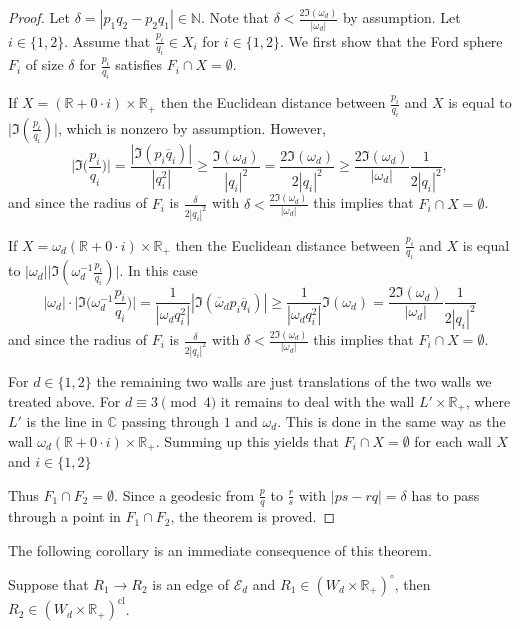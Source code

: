 \documentclass[graybox]{svmult}
\begin{document}
\begin{proof}
Let $\delta=|p_1q_2-p_2q_1| \in\mathbb{N}$. Note that $\delta<\frac{2\Im(\omega_d)}{|\omega_d|}$ by assumption. Let $i\in\{1,2\}$. Assume that $\frac{p_i}{q_i} \in X_i$ for $i\in\{1,2\}$.   
We first show that the Ford sphere $F_i$ of size $\delta$ for $\frac {p_i}{q_i}$ satisfies $F_i\cap X=\emptyset$. 

If  $X=(\mathbb{R}+0\cdot i)\times\mathbb{R}_+$ then the Euclidean distance between $\frac{p_i}{q_i} $ and $X$ is equal to $\big|\Im(\frac{p_i}{q_i})\big|$, which is nonzero by assumption. However, 
\[
\bigg|\Im\Big(\frac {p_i}{q_i} \Big)\bigg| =  \frac{|\Im(p_i \overline{q}_i)| }{|q_i^2|} \ge \frac{\Im(\omega_d)}{|q_i|^2}=\frac{2 \Im(\omega_d)}{2|q_i|^2}   \ge \frac{2\Im(\omega_d)}{|\omega_d|}\frac{1}{2|q_i|^2},
\]
and since the radius of $F_i$ is $\frac{\delta}{2|q_i|^2}$ with $\delta<\frac{2\Im(\omega_d)}{|\omega_d|}$ this implies that $F_i\cap X=\emptyset$. 


If $X=\omega_d (\mathbb{R}+0\cdot i)\times\mathbb{R}_+$ then the Euclidean distance between $\frac{p_i}{q_i}$ and $X$ is equal to $|\omega_d| \big|\Im(\omega_d^{-1} \frac{p_i}{q_i})\big|$. In this case
\[
|\omega_d|\cdot\Big|\Im\Big(\omega_d^{-1} \frac{p_i}{q_i}\Big) \Big|
= \frac1{|\omega_d q_i^2|} |\Im(\overline{\omega}_d p_i \overline{q}_i)|
\ge 
\frac1{|\omega_d q_i^2|} \Im(\omega_d)
=
\frac{2\Im(\omega_d)}{|\omega_d|}\frac{1}{2|q_i|^2}
\]
and since the radius of $F_i$ is $\frac \delta{2|q_i|^2}$ with $\delta< \frac{2\Im(\omega_d)}{|\omega_d|}$ this implies that $F_i\cap X=\emptyset$.
 

For $d\in \{1,2\}$ the remaining two walls are just translations of the two walls we treated above. For $d\equiv 3\pmod{4}$ it remains to deal with the wall $L'\times\mathbb{R}_+$, where $L'$ is the line in $\mathbb{C}$ passing through $1$ and $\omega_d$. This is done in the same way as the wall $\omega_d(\mathbb{R}+0\cdot i) \times\mathbb{R}_+$. Summing up this yields that $F_i \cap X = \emptyset$ for each wall $X$ and $i\in\{1,2\}$

Thus $F_1 \cap F_2=\emptyset$. Since a geodesic from $\frac pq$ to $\frac rs$ with $|ps-rq|=\delta$ has to pass through a point in $F_1 \cap F_2$, the theorem is proved.
\end{proof}

The following corollary is an immediate consequence of this theorem.

\begin{corollary}
Suppose that $R_{1} \to R_{2}$ is an edge of $\mathcal E_{d}$ and $R_{1} \in 
(W_{d} \times \mathbb{R}_+)^{\circ}$, then $R_{2} \in (W_{d} \times \mathbb{R}_+)^{\mathrm{cl}}$.  
\end{corollary}
\end{document}
